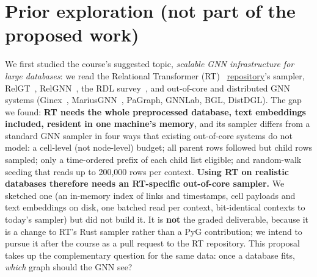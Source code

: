 \documentclass{article}
\begin{document}
\normalsize
\appendix
\section{Prior exploration (not part of the proposed work)}
\vspace{-0.5em}
We first studied the course's suggested topic, \emph{scalable GNN infrastructure for large databases}: we read the Relational Transformer (RT)~\cite{ranjan2025rt} \href{https://github.com/stanford-star/relational-transformer}{repository}'s sampler, RelGT~\cite{dwivedi2025relgt}, RelGNN~\cite{chen2025relgnn}, the RDL survey~\cite{rdlsurvey2025}, and out-of-core and distributed GNN systems (Ginex~\cite{park2022ginex}, MariusGNN~\cite{waleffe2023mariusgnn}, PaGraph, GNNLab, BGL, DistDGL). The gap we found: \textbf{RT needs the whole preprocessed database, text embeddings included, resident in one machine's memory}, and its sampler differs from a standard GNN sampler in four ways that existing out-of-core systems do not model: a cell-level (not node-level) budget; all parent rows followed but child rows sampled; only a time-ordered prefix of each child list eligible; and random-walk seeding that reads up to 200{,}000 rows per context. \textbf{Using RT on realistic databases therefore needs an RT-specific out-of-core sampler.} We sketched one (an in-memory index of links and timestamps, cell payloads and text embeddings on disk, one batched read per context, bit-identical contexts to today's sampler) but did not build it. It is \textbf{not} the graded deliverable, because it is a change to RT's Rust sampler rather than a PyG contribution; we intend to pursue it after the course as a pull request to the RT repository. This proposal takes up the complementary question for the same data: once a database fits, \emph{which} graph should the GNN see?
\end{document}
